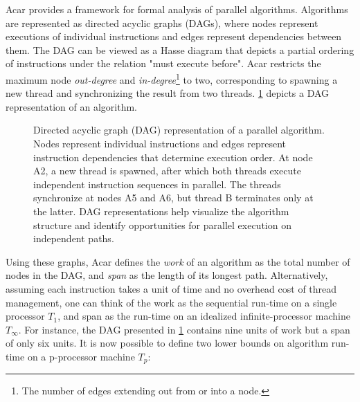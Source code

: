 \documentclass[english,12pt,a4paper,pdftex,sci,utf8]{aaltothesis}
\begin{document}
Acar \cite{acar2016parallel} provides a framework for formal analysis of parallel algorithms. Algorithms are represented as directed acyclic graphs (DAGs), where nodes represent executions of individual instructions and edges represent dependencies between them. The DAG can be viewed as a Hasse diagram that depicts a partial ordering of instructions under the relation "must execute before". Acar restricts the maximum node \emph{out-degree} and \emph{in-degree}\footnote{The number of edges extending out from or into a node.} to two, corresponding to spawning a new thread and synchronizing the result from two threads. \cref{fig:DAG-algo} depicts a DAG representation of an algorithm.

\begin{figure}[h]
\centering
{}
\caption{Directed acyclic graph (DAG) representation of a parallel algorithm. Nodes represent individual instructions and edges represent instruction dependencies that determine execution order. At node A2, a new thread is spawned, after which both threads execute independent instruction sequences in parallel. The threads synchronize at nodes A5 and A6, but thread B terminates only at the latter. DAG representations help visualize the algorithm structure and identify opportunities for parallel execution on independent paths.}
\label{fig:DAG-algo}
\end{figure}
\clearpage
Using these graphs, Acar \cite{acar2016parallel} defines the \emph{work} of an algorithm as the total number of nodes in the DAG, and \emph{span} as the length of its longest path. Alternatively, assuming each instruction takes a unit of time and no overhead cost of thread management, one can think of the work as the sequential run-time on a single processor $T_1$, and span as the run-time on an idealized infinite-processor machine $T_{\infty}$. For instance, the DAG presented in \cref{fig:DAG-algo} contains nine units of work but a span of only six units. It is now possible to define two lower bounds on algorithm run-time on a p-processor machine $T_p$:
\end{document}
